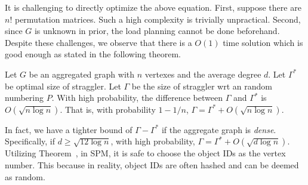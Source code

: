 It is challenging to directly optimize the above equation. 
First, suppose there are $n!$ permutation matrices. 
Such a high complexity is trivially unpractical. Second,
since $G$ is unknown in prior,
the load planning cannot be done beforehand. 
Despite these challenges, we observe that there is a 
$O(1)$ time solution which is good enough as stated in the 
following theorem.

\begin{theorem}
\label{THM:SPM_LB}
Let $G$ be an aggregated graph with $n$ vertexes and the average degree $d$.
Let $\Gamma^*$ be optimal size of straggler.
Let $\Gamma$ be the size of straggler wrt an random numbering $P$. 
With high probability, the difference between $\Gamma$ and $\Gamma^*$ is $O(\sqrt{n \log n})$.
That is,  with probability $1-1/n$, 
$\Gamma = \Gamma^* + O(\sqrt{n \log n})$.
\end{theorem}

In fact, we have a tighter bound of $\Gamma - \Gamma^*$ if 
the aggregate graph is \emph{dense}. Specifically, if $d\geq \sqrt{12\log n}$, with
high probability, $\Gamma = \Gamma^* + O(\sqrt{d\log n})$.
Utilizing Theorem~\label{THM:SPM_LB}, in SPM, it is safe to choose the object IDs as 
the vertex number. This because in reality, object IDs are often 
hashed and can be deemed as random.